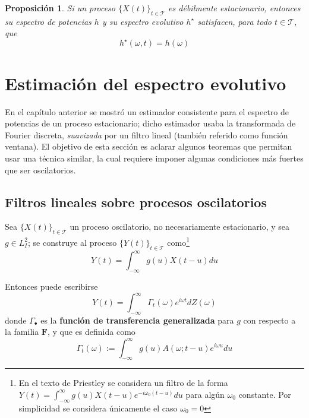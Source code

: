 \documentclass[12pt,letterpaper,draft]{book}
\newtheorem{proposicion}[teorema]{Proposición}
\newcommand{\intR}{\int_{-\infty}^{\infty}}
\newcommand{\ef}{\mathbf{F}}
\newcommand{\xt}{$\{X(t)\}_{t\in \mathcal{T}}$ }
\newcommand{\lldos}{L^{2}_I}
\begin{document}
\begin{proposicion}
Si un proceso \xt es débilmente estacionario, entonces su espectro de potencias $h$ y su espectro evolutivo $h^{\star}$ satisfacen, para todo $t\in \mathcal{T}$, que
\begin{equation}
h^{\star}(\omega, t) = h(\omega)
\end{equation}
\end{proposicion}


\section{Estimación del espectro evolutivo}
\label{sec:estimacion}

En el capítulo anterior se mostró un estimador consistente para el espectro de potencias de un proceso estacionario; dicho estimador usaba la transformada de Fourier discreta, \textit{suavizada} por un filtro lineal (también referido como función ventana).
%
El objetivo de esta sección es aclarar algunos teoremas que permitan usar una técnica similar, la cual requiere imponer algunas condiciones más fuertes que ser oscilatorios.

\subsection{Filtros lineales sobre procesos oscilatorios}

Sea \xt un proceso oscilatorio, no necesariamente estacionario, y sea $g\in \lldos$; se construye al proceso $\{Y(t)\}_{t\in \mathcal{T}}$ como\footnote{En el texto de Priestley se considera un filtro de la forma $Y(t) = \intR g(u) X(t-u) e^{-i \omega_0 (t-u)} du$ para algún $\omega_0$ constante. 
%
Por simplicidad se considera únicamente el caso $\omega_0=0$}
\begin{equation}
Y(t) = \intR g(u) X(t-u) du
\end{equation}

Entonces puede escribirse 
\begin{equation}
Y(t) = \intR \Gamma_t(\omega) e^{i \omega t} dZ(\omega) 
\label{se6:filtrado}
\end{equation}
donde $\Gamma_\bullet$ es la \textbf{función de transferencia generalizada} para $g$ con respecto a la familia $\ef$, y que es definida como
\begin{equation}
\Gamma_t (\omega) := \intR g(u) A(\omega; t-u) e^{i \omega u} du
\label{se6:trans_general}
\end{equation}
\end{document}
